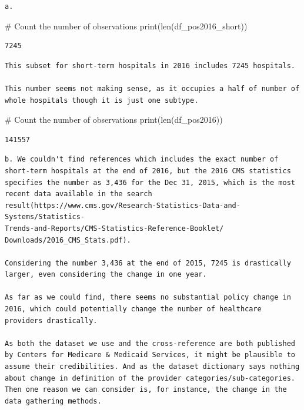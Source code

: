 \documentclass[
  letterpaper,
  DIV=11,
  numbers=noendperiod]{scrartcl}
\newenvironment{Shaded}{\begin{snugshade}}{\end{snugshade}}
\newcommand{\BuiltInTok}[1]{\textcolor[rgb]{0.00,0.23,0.31}{#1}}
\newcommand{\CommentTok}[1]{\textcolor[rgb]{0.37,0.37,0.37}{#1}}
\newcommand{\NormalTok}[1]{\textcolor[rgb]{0.00,0.23,0.31}{#1}}
\begin{document}
\begin{verbatim}
a.    
\end{verbatim}

\begin{Shaded}
\begin{Highlighting}[]
\CommentTok{\# Count the number of observations}
\BuiltInTok{print}\NormalTok{(}\BuiltInTok{len}\NormalTok{(df\_pos2016\_short))}
\end{Highlighting}
\end{Shaded}

\begin{verbatim}
7245
\end{verbatim}

\begin{verbatim}
This subset for short-term hospitals in 2016 includes 7245 hospitals.

This number seems not making sense, as it occupies a half of number of whole hospitals though it is just one subtype. 
\end{verbatim}

\begin{Shaded}
\begin{Highlighting}[]
\CommentTok{\# Count the number of observations}
\BuiltInTok{print}\NormalTok{(}\BuiltInTok{len}\NormalTok{(df\_pos2016))}
\end{Highlighting}
\end{Shaded}

\begin{verbatim}
141557
\end{verbatim}

\begin{verbatim}
b. We couldn't find references which includes the exact number of short-term hospitals at the end of 2016, but the 2016 CMS statistics specifies the number as 3,436 for the Dec 31, 2015, which is the most recent data available in the search result(https://www.cms.gov/Research-Statistics-Data-and-Systems/Statistics-
Trends-and-Reports/CMS-Statistics-Reference-Booklet/
Downloads/2016_CMS_Stats.pdf).

Considering the number 3,436 at the end of 2015, 7245 is drastically larger, even considering the change in one year.

As far as we could find, there seems no substantial policy change in 2016, which could potentially change the number of healthcare providers drastically.

As both the dataset we use and the cross-reference are both published by Centers for Medicare & Medicaid Services, it might be plausible to assume their credibilities. And as the dataset dictionary says nothing about change in definition of the provider categories/sub-categories. Then one reason we can consider is, for instance, the change in the data gathering methods. 
\end{verbatim}
\end{document}
